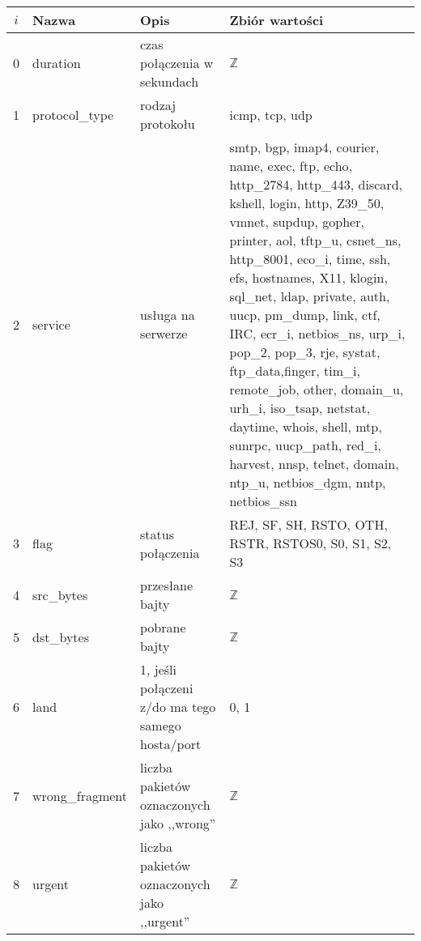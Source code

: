 \documentclass[a4paper, 12pt]{article}
\begin{document}
\begin{tabular}{ | c | p{3cm} | p{3cm} | p{6cm} | } \hline
$i$ & Nazwa & Opis & Zbiór wartości \\ \hline
0      & duration & czas połączenia w sekundach & $\mathbb{Z}$ \\ \hline
1      & protocol\_type & rodzaj protokołu & icmp, tcp, udp \\ \hline
2      & service & usługa na serwerze & smtp, bgp, imap4, courier, name, exec, ftp, echo, http\_2784,
                       http\_443, discard, kshell, login, http, Z39\_50, vmnet, supdup,
                       gopher, printer, aol, tftp\_u, csnet\_ns, http\_8001, eco\_i, time,
                       ssh, efs, hostnames, X11, klogin, sql\_net, ldap, private,
                       auth, uucp, pm\_dump, link, ctf, IRC, ecr\_i, netbios\_ns, urp\_i,
                       pop\_2, pop\_3, rje, systat, ftp\_data,finger, tim\_i, remote\_job,
                       other, domain\_u, urh\_i, iso\_tsap, netstat, daytime, whois, shell,
                       mtp, sunrpc, uucp\_path, red\_i, harvest, nnsp, telnet, domain,
                       ntp\_u, netbios\_dgm, nntp, netbios\_ssn \\ \hline
3      & flag & status połączenia & REJ, SF, SH, RSTO, OTH, RSTR, RSTOS0, S0, S1, S2, S3 \\ \hline
4      & src\_bytes  & przesłane bajty & $\mathbb{Z}$ \\ \hline
5      & dst\_bytes  & pobrane bajty   & $\mathbb{Z}$ \\ \hline
6      & land & 1, jeśli połączeni z/do ma tego samego hosta/port & 0, 1 \\ \hline
7      & wrong\_fragment  & liczba pakietów oznaczonych jako ,,wrong'' & $\mathbb{Z}$ \\ \hline
8      & urgent  & liczba pakietów oznaczonych jako ,,urgent''  & $\mathbb{Z}$ \\ \hline
\end{tabular}
\end{document}
